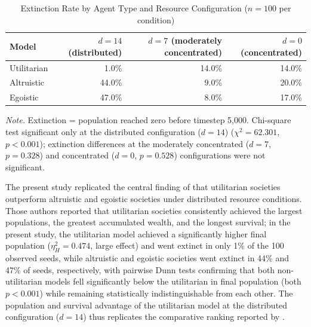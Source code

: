 \documentclass{icsthesis}
\begin{document}
\begin{mainmatter}
		\begin{table}[H]
		\vspace{2ex}
		\centering
		\caption{Extinction Rate by Agent Type and Resource Configuration ($n = 100$ per condition)}
		\label{table:extinction-rate}
		\footnotesize
		\renewcommand{\arraystretch}{1.3}
		\begin{tabular}{l r r r}
		\hline\hline
		\textbf{Model} & \textbf{$d = 14$ (distributed)} & \textbf{$d = 7$ (moderately concentrated)} & \textbf{$d = 0$ (concentrated)} \\
		\hline
		Utilitarian &  1.0\% & 14.0\% & 14.0\% \\
		Altruistic  & 44.0\% &  9.0\% & 20.0\% \\
		Egoistic    & 47.0\% &  8.0\% & 17.0\% \\
		\hline
		\end{tabular}
		\par\smallskip
		{\footnotesize\noindent\textit{Note.} Extinction = population reached zero before timestep 5,000. Chi-square test significant only at the distributed configuration ($d = 14$) ($\chi^2 = 62.301$, $p < 0.001$); extinction differences at the moderately concentrated ($d = 7$, $p = 0.328$) and concentrated ($d = 0$, $p = 0.528$) configurations were not significant.}
		\end{table}

The present study replicated the central finding of \citet{KremerHerman2024} that utilitarian societies outperform altruistic and egoistic societies under distributed resource conditions. Those authors reported that utilitarian societies consistently achieved the largest populations, the greatest accumulated wealth, and the longest survival; in the present study, the utilitarian model achieved a significantly higher final population ($\eta^2_H = 0.474$, large effect) and went extinct in only 1\% of the 100 observed seeds, while altruistic and egoistic societies went extinct in 44\% and 47\% of seeds, respectively, with pairwise Dunn tests confirming that both non-utilitarian models fell significantly below the utilitarian in final population (both $p < 0.001$) while remaining statistically indistinguishable from each other. The population and survival advantage of the utilitarian model at the distributed configuration ($d = 14$) thus replicates the comparative ranking reported by \citet{KremerHerman2024}.


\end{mainmatter}
\end{document}
